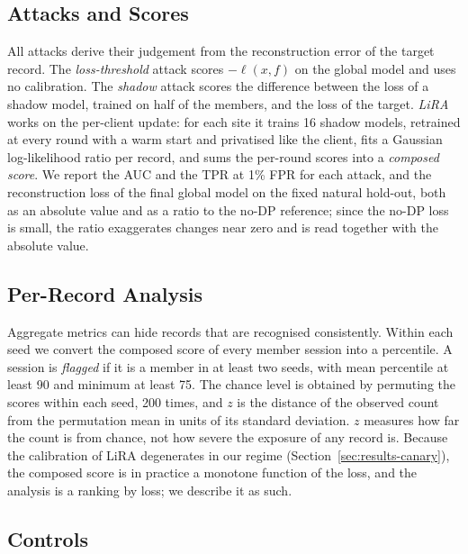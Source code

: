 
\subsection{Attacks and Scores}
\label{sec:method-attacks}

All attacks derive their judgement from the reconstruction error of the target
record. The \emph{loss-threshold} attack scores $-\ell(x, f)$ on the global
model and uses no calibration. The \emph{shadow} attack scores the difference
between the loss of a shadow model, trained on half of the members, and the
loss of the target. \emph{LiRA} works on the per-client update: for each site
it trains 16 shadow models, retrained at every round with a warm start and
privatised like the client, fits a Gaussian log-likelihood ratio per record,
and sums the per-round scores into a \emph{composed score}. We report the AUC
and the TPR at 1\% FPR for each attack, and the reconstruction loss of the
final global model on the fixed natural hold-out, both as an absolute value and
as a ratio to the no-DP reference; since the no-DP loss is small, the ratio
exaggerates changes near zero and is read together with the absolute value.

\subsection{Per-Record Analysis}
\label{sec:method-perrecord}

Aggregate metrics can hide records that are recognised consistently. Within
each seed we convert the composed score of every member session into a
percentile. A session is \emph{flagged} if it is a member in at least two seeds,
with mean percentile at least 90 and minimum at least 75. The chance level is
obtained by permuting the scores within each seed, 200 times, and $z$ is the
distance of the observed count from the permutation mean in units of its
standard deviation. $z$ measures how far the count is from chance, not how
severe the exposure of any record is. Because the calibration of LiRA
degenerates in our regime (Section~\ref{sec:results-canary}), the composed
score is in practice a monotone function of the loss, and the analysis is a
ranking by loss; we describe it as such.

\subsection{Controls}
\label{sec:method-controls}

